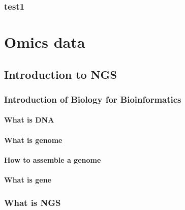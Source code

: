 \documentclass[]{book}
\begin{document}
\hypertarget{test1}{%
\section{test1}\label{test1}}

\hypertarget{part-omics-data}{%
\part{Omics data}\label{part-omics-data}}

\hypertarget{introduction-to-ngs}{%
\chapter{Introduction to NGS}\label{introduction-to-ngs}}

\hypertarget{introduction-of-biology-for-bioinformatics}{%
\section{Introduction of Biology for Bioinformatics}\label{introduction-of-biology-for-bioinformatics}}

\hypertarget{what-is-dna}{%
\subsection{What is DNA}\label{what-is-dna}}

\hypertarget{what-is-genome}{%
\subsection{What is genome}\label{what-is-genome}}

\hypertarget{how-to-assemble-a-genome}{%
\subsection{How to assemble a genome}\label{how-to-assemble-a-genome}}

\hypertarget{what-is-gene}{%
\subsection{What is gene}\label{what-is-gene}}

\hypertarget{what-is-ngs}{%
\section{What is NGS}\label{what-is-ngs}}
\end{document}
